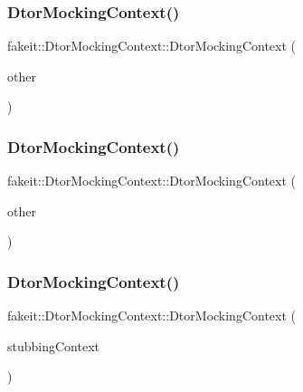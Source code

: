 \subsubsection{\texorpdfstring{DtorMockingContext()}{DtorMockingContext()}\hspace{0.1cm}{\footnotesize\ttfamily [5/27]}}
{\footnotesize\ttfamily fakeit\+::\+Dtor\+Mocking\+Context\+::\+Dtor\+Mocking\+Context (\begin{DoxyParamCaption}\item[{\mbox{\hyperlink{classfakeit_1_1DtorMockingContext}{Dtor\+Mocking\+Context}} \&}]{other }\end{DoxyParamCaption})\hspace{0.3cm}{\ttfamily [inline]}}

\mbox{\label{classfakeit_1_1DtorMockingContext_a0cf507524171b8ab2884f269a8a62a60}} 
\subsubsection{\texorpdfstring{DtorMockingContext()}{DtorMockingContext()}\hspace{0.1cm}{\footnotesize\ttfamily [6/27]}}
{\footnotesize\ttfamily fakeit\+::\+Dtor\+Mocking\+Context\+::\+Dtor\+Mocking\+Context (\begin{DoxyParamCaption}\item[{\mbox{\hyperlink{classfakeit_1_1DtorMockingContext}{Dtor\+Mocking\+Context}} \&\&}]{other }\end{DoxyParamCaption})\hspace{0.3cm}{\ttfamily [inline]}}

\mbox{\label{classfakeit_1_1DtorMockingContext_a81c785463a44f396c4c3e5e0e1c9e40d}} 
\subsubsection{\texorpdfstring{DtorMockingContext()}{DtorMockingContext()}\hspace{0.1cm}{\footnotesize\ttfamily [7/27]}}
{\footnotesize\ttfamily fakeit\+::\+Dtor\+Mocking\+Context\+::\+Dtor\+Mocking\+Context (\begin{DoxyParamCaption}\item[{\mbox{\hyperlink{classfakeit_1_1MethodMockingContext}{Method\+Mocking\+Context}}$<$ void $>$\+::Context $\ast$}]{stubbing\+Context }\end{DoxyParamCaption})\hspace{0.3cm}{\ttfamily [inline]}}

